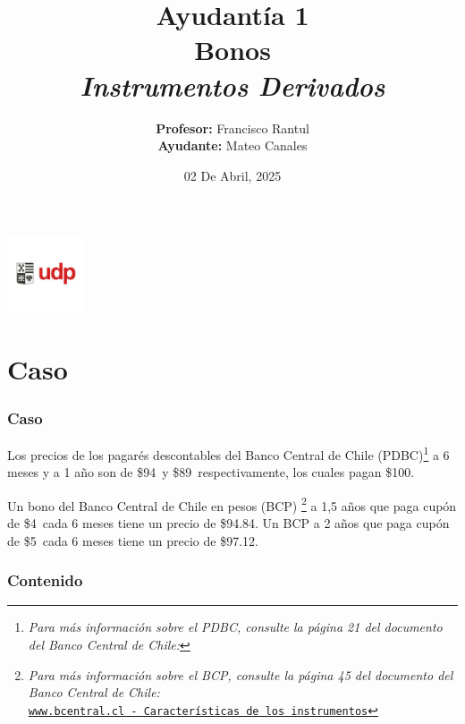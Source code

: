 \documentclass{beamer}
\title{Ayudantía 1 \\ Bonos \\ \large\textit{Instrumentos Derivados}}
\author{
  \texorpdfstring{
    \textbf{Profesor:} Francisco Rantul \\[0.3em]
    \textbf{Ayudante:} Mateo Canales
  }{Profesor: Francisco Rantul, Ayudante: Mateo Canales}
}
\institute{Universidad Diego Portales}
\date{02 De Abril, 2025}
\begin{document}
\begin{frame}
    \titlepage
    \vfill
    \centering
    \includegraphics[width=2.3118cm]{../imagenes/logo.png}
  \end{frame}
%
\newcommand{\Nominal}{100}    %
\newcommand{\Fseis}{94}     %
\newcommand{\Funo}{89}      %

\newcommand{\PunoCinco}{94.84}  %
\newcommand{\Pdos}{97.12}       %

\newcommand{\CunoCinco}{4}  %
\newcommand{\Cdos}{5}       %

\newcommand{\Tseis}{0.5}
\newcommand{\Tuno}{1.0}
\newcommand{\TunoCinco}{1.5}
\newcommand{\Tdos}{2.0}

\newcommand{\Ffinal}{104}
\newcommand{\FfinalDos}{105}


\section{Caso}
  \begin{frame}
    
  \frametitle{Caso}

  Los precios de los pagarés descontables del Banco Central de Chile (PDBC)\footnote{\textit{Para 
  más información sobre el PDBC, consulte la página 21 del documento del Banco Central de Chile:}}
  a 6 meses y a 1 año son de \$\Fseis\ y \$\Funo\, respectivamente, los cuales pagan \$\Nominal.
  \vspace{0.5em}
  
  
  Un bono del Banco Central de Chile en pesos (BCP) \footnote{\textit{Para más información sobre el BCP, 
  consulte la página 45 del documento del Banco Central de Chile:}\\
  \tiny{\href{https://www.bcentral.cl/contenido/-/detalle/caracteristicas-de-los-instrumentos-del-mercado-financiero-nacional-3}
  {\texttt{www.bcentral.cl - Características de los instrumentos}}}}
  a 1,5 años que paga cupón de  \$\CunoCinco\  cada 6 meses tiene un precio de \$\PunoCinco. 
  Un BCP a 2 años que paga
  cupón de \$\Cdos\ cada 6 meses tiene un precio de \$\Pdos.

  \end{frame}
\begin{frame}
    \frametitle{Contenido}
    \tableofcontents
\end{frame}
\end{document}
